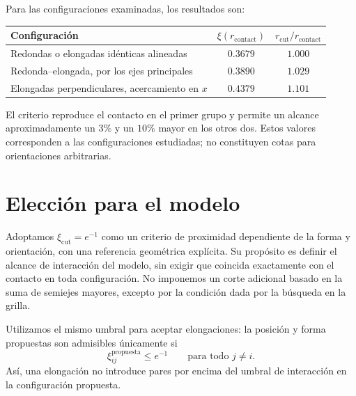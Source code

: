 \documentclass[a4paper,11pt]{article}
\begin{document}
	Para las configuraciones examinadas, los resultados son:
	
	\begin{center}
		\begin{tabular}{lcc}
			\toprule
			Configuración
			& $\xi(r_{\mathrm{contact}})$
			& $r_{\mathrm{cut}}/r_{\mathrm{contact}}$ \\
			\midrule
			Redondas o elongadas idénticas alineadas
			& $0.3679$ & $1.000$ \\
			Redonda--elongada, por los ejes principales
			& $0.3890$ & $1.029$ \\
			Elongadas perpendiculares, acercamiento en $x$
			& $0.4379$ & $1.101$ \\
			\bottomrule
		\end{tabular}
	\end{center}
	
	El criterio reproduce el contacto en el primer grupo y
	permite un alcance aproximadamente un $3\%$ y un $10\%$
	mayor en los otros dos. Estos valores corresponden a
	las configuraciones estudiadas; no constituyen cotas
	para orientaciones arbitrarias.
	
	\section{Elección para el modelo}
	
	Adoptamos $\xi_{\mathrm{cut}}=e^{-1}$ como un criterio de
	proximidad dependiente de la forma y orientación, con una
	referencia geométrica explícita. Su propósito es definir
	el alcance de interacción del modelo, sin exigir que
	coincida exactamente con el contacto en toda configuración. No imponemos un corte adicional basado en la suma de semiejes mayores, excepto por la condición dada por la búsqueda en la grilla.
	
	Utilizamos el mismo umbral para aceptar elongaciones:
	la posición y forma propuestas son admisibles únicamente si
	\begin{equation}
		\xi_{ij}^{\mathrm{propuesta}}\leq e^{-1}
		\qquad
		\text{para todo } j\neq i.
	\end{equation}
	Así, una elongación no introduce pares por encima del umbral de interacción en la configuración propuesta.
	
\end{document}
